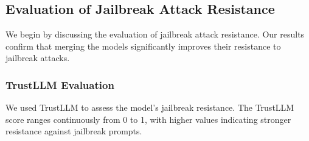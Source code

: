 \documentclass[conference,compsoc]{IEEEtran}
\begin{document}
\subsection{Evaluation of Jailbreak Attack Resistance}
We begin by discussing the evaluation of jailbreak attack resistance. Our results confirm that merging the models significantly improves their resistance to jailbreak attacks.

\subsubsection{TrustLLM Evaluation}
We used TrustLLM to assess the model’s jailbreak resistance. The TrustLLM score ranges continuously from 0 to 1, with higher values indicating stronger resistance against jailbreak prompts.

\end{document}
